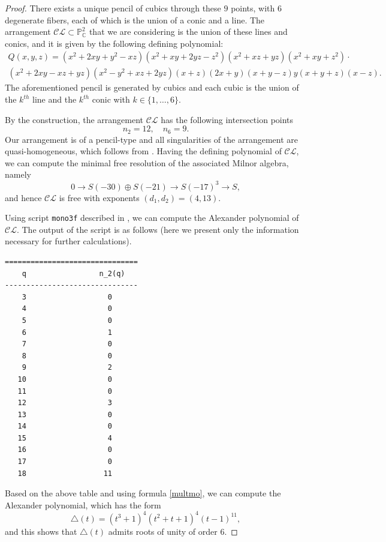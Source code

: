 \documentclass[11pt]{article}
\theoremstyle{plain}
\theoremstyle{definition}
\theoremstyle{plain}
\begin{document}
\begin{proof}
There exists a unique pencil of cubics through these $9$ points, with $6$ 
degenerate fibers, each of which is the union of a conic and a line.
The arrangement $\mathcal{CL}\subset \mathbb{P}^{2}_{\mathbb{C}}$ that we are 
considering is the union of these lines and conics, and it is given by the following defining polynomial:
\begin{multline*}
    Q(x,y,z)= (x^{2} + 2xy + y^{2} - xz)(x^2 + xy + 2yz - z^2 )(x^2 + xz + yz)(x^2 + xy + z^2 )\cdot \\ (x^2 + 2xy - xz + yz)(x^2 - y^2 + xz + 2yz)(x + z)(2x + y)(x + y - z)y(x + y + z)(x - z).
\end{multline*}
The aforementioned pencil is generated by cubics and each cubic is the union of the $k^{th}$ line and the $k^{th}$ conic with $k\in \{1,\ldots,6\}$.

By the construction, the arrangement $\mathcal{CL}$ has the following intersection points
$$n_{2} = 12, \quad  n_{6}=9.$$
Our arrangement is of a pencil-type and all singularities of the arrangement are quasi-homogeneous, which follows from \cite{DJP}. Having the defining polynomial of $\mathcal{CL}$, we can compute the minimal free resolution of the associated Milnor algebra, namely
$$0\rightarrow S(-30) \oplus S(-21) \rightarrow S(-17)^3 \rightarrow S,$$
and hence $\mathcal{CL}$ is free with exponents $(d_{1}, d_{2}) = (4,13)$.

Using script \verb}mono3f} described in \cite{DimcaSc}, we can compute the Alexander polynomial of $\mathcal{CL}$. The output of the script is as follows (here we present only the information necessary for further calculations). 

\begin{center}
\footnotesize
\begin{BVerbatim} 
===============================
    q                 n_2(q)   
-------------------------------
    3                   0         
    4                   0         
    5                   0         
    6                   1        
    7                   0        
    8                   0        
    9                   2        
   10                   0        
   11                   0       
   12                   3        
   13                   0        
   14                   0        
   15                   4        
   16                   0        
   17                   0        
   18                  11        
\end{BVerbatim}
\end{center}
Based on the above table and using formula \eqref{multmo}, we can compute the Alexander polynomial, which has the form
$$\triangle(t) = (t^3+1)^{4}(t^{2}+t+1)^{4}(t-1)^{11},$$
and this shows that $\triangle(t)$ admits roots of unity of order $6$.
\end{proof}
\end{document}
